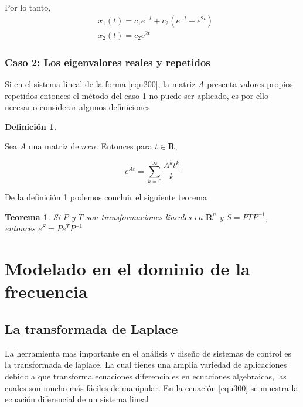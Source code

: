 \documentclass[12pt]{book}
\newtheorem{thm}{Teorema}[section]
\theoremstyle{definition}
\newtheorem{dfn}{Definición}[section]
\theoremstyle{remark}
\theoremstyle{plain}
\begin{document}
Por lo tanto,
\begin{align*}
& x_1(t) = c_1 e^{-t}+c_2 (e^{-t}-e^{2t}) \\
& x_2(t) =  c_2 e ^{2t}
\end{align*}

\subsection{Caso 2: Los eigenvalores reales y repetidos}

Si en el sistema lineal de la forma \ref{equ200}, la matriz $A$ presenta valores propios repetidos entonces el método del caso 1 no puede ser aplicado, es por ello necesario considerar algunos definiciones 

\begin{dfn}
\label{def200}

Sea $A$ una matriz de $nxn$. Entonces para $t\in \mathbf{R}$,

\begin{equation*}
e^{A t} = \sum ^\infty _{k=0}\frac{A^k t^k}{k\!}
\end{equation*}
\end{dfn}

De la definición \ref{def200} podemos concluir el siguiente teorema

\begin{thm}
\label{teo200}
Si $P$ y $T$ son transformaciones lineales en $\mathbf{R}^{n}$ y $S=PTP^{-1}$, entonces $e^{S}=Pe^{T}P^{-1}$
\end{thm}

\chapter{Modelado en el dominio de la frecuencia}

\section{La transformada de Laplace}
La herramienta mas importante en el análisis y diseño de sistemas de control es la transformada de laplace. La cual tienes una amplia variedad de aplicaciones debido a que transforma ecuaciones diferenciales en ecuaciones algebraicas, las cuales son mucho más fáciles de manipular. En la ecuación \ref{equ300} se muestra la ecuación diferencial de un sistema lineal
\end{document}
